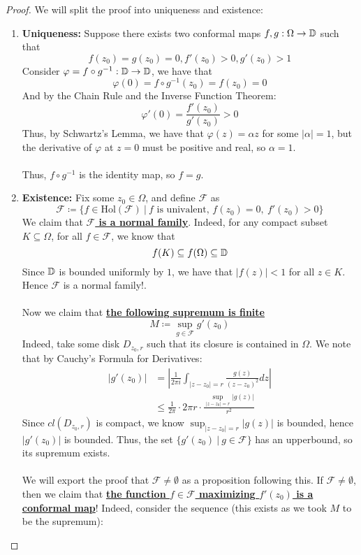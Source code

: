 \begin{proof}
    We will split the proof into uniqueness and existence:
    \begin{enumerate}
        \item \textbf{Uniqueness: } Suppose there exists two conformal maps $f, g: \Omega \to \mathbb{D}$ such that
        \[f(z_0) = g(z_0) = 0, f'(z_0) > 0, g'(z_0) > 1\]
        Consider $\varphi = f \circ g^{-1}: \mathbb{D} \to \mathbb{D}$, we have that
        \[\varphi(0) = f \circ g^{-1}(z_0) = f(z_0) = 0\]
        And by the Chain Rule and the Inverse Function Theorem:
        \[\varphi'(0) = \frac{f'(z_0)}{g'(z_0)} > 0\]
        Thus, by Schwartz's Lemma, we have that $\varphi(z) = \alpha z$ for some $|\alpha| = 1$, but the derivative of $\varphi$ at $z = 0$ must be positive and real, so $\alpha = 1$.\\\\
        Thus, $f \circ g^{-1}$ is the identity map, so $f = g$.
        \item \textbf{Existence: } Fix some $z_0 \in \Omega$, and define $\mathcal{F}$ as
        \[\mathcal{F}\coloneqq \{f \in \text{Hol}(\mathcal{F})\ |\ \text{$f$ is univalent, }f(z_0) = 0,\ f'(z_0) > 0\}\]
        We claim that \ul{\textbf{$\mathcal{F}$ is a normal family}}. Indeed, for any compact subset $K \subseteq \Omega$, for all $f \in \mathcal{F}$, we know that
        \[f(K) \subseteq f(\Omega) \subseteq \mathbb{D}\]
        Since $\mathbb{D}$ is bounded uniformly by $1$, we have that $|f(z)| < 1$ for all $ z\in K$. Hence $\mathcal{F}$ is a normal family!.\\\\
        Now we claim that \ul{\textbf{the following supremum is finite}}
        \[M \coloneqq \sup_{g \in \mathcal{F}} g'(z_0)\]
        Indeed, take some disk $D_{z_0, r}$ such that its closure is contained in $\Omega$. We note that by Cauchy's Formula for Derivatives:
        \begin{align*}
            |g'(z_0)| &= |\frac{1}{2\pi i} \int_{|z - z_0| = r} \frac{g(z)}{(z - z_0)^2} dz|\\
            &\leq \frac{1}{2\pi} \cdot 2 \pi r \cdot \frac{\sup_{|z - z_0| = r} |g(z)|}{r^2}
        \end{align*}
        Since $cl(D_{z_0, r})$ is compact, we know $\sup_{|z - z_0| = r} |g(z)|$ is bounded, hence $|g'(z_0)|$ is bounded. Thus, the set $\{g'(z_0)\ |\ g \in \mathcal{F}\}$ has an upperbound, so its supremum exists.\\\\
        We will export the proof that $\mathcal{F} \neq \emptyset$ as a proposition following this. If $\mathcal{F} \neq \emptyset$, then we claim that \ul{\textbf{the function $f \in \mathcal{F}$ maximizing $f'(z_0)$ is a conformal map}}! Indeed, consider the sequence (this exists as we took $M$ to be the supremum):

\end{enumerate}
\end{proof}
